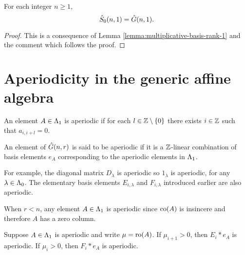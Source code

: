 \documentclass[a4paper, 11pt]{report}
\begin{document}
\begin{corollary}\label{lemma:generic-zero-schur-same-in-rank-1}
For each integer $n\geq 1$,
\begin{equation*}
\zeroschur[n,1] = \generic[n,1].
\end{equation*}
\end{corollary}

\begin{proof}
This is a consequence of Lemma \ref{lemma:multiplicative-basis-rank-1} and the comment which follows the proof.
\end{proof}


\section{Aperiodicity in the generic affine algebra}


\begin{definition}\label{def:aperiodic}
An element $A\in\matrices$ is aperiodic if for each $l\in\integers\setminus\{0\}$ there exists $i\in\integers$ such that $a_{i,i+l}=0$.
\end{definition}

An element of $\generic$ is said to be aperiodic if it is a $\integers$-linear combination of basis elements $e_A$ corresponding to the aperiodic elements in $\matrices$.

For example, the diagonal matrix $D_\lambda$ is aperiodic so $1_\lambda$ is aperiodic, for any $\lambda\in\compositions$. The elementary basis elements $E_{i,\lambda}$ and $F_{i,\lambda}$ introduced earlier are also aperiodic.

When $r<n$, any element $A\in\matrices$ is aperiodic since $\co{A}$ is insincere and therefore $A$ has a zero column.

\begin{lemma}\label{lemma:words-are-aperiodic}
Suppose $A\in\matrices$ is aperiodic and write $\mu=\ro{A}$. If $\mu_{i+1}>0$, then $E_i\ast e_A$ is aperiodic. If $\mu_i>0$, then $F_i\ast e_A$ is aperiodic.
\end{lemma}
\end{document}
